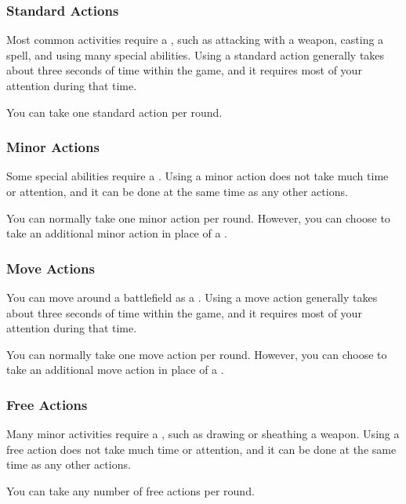         \subsubsection{Standard Actions}\label{Standard Actions}
            Most common activities require a , such as attacking with a weapon, casting a spell, and using many special abilities.
            Using a standard action generally takes about three seconds of time within the game, and it requires most of your attention during that time.

            You can take one standard action per round.

        \subsubsection{Minor Actions}\label{Minor Actions}
            Some special abilities require a .
            Using a minor action does not take much time or attention, and it can be done at the same time as any other actions.

            You can normally take one minor action per round.
            However, you can choose to take an additional minor action in place of a .

        \subsubsection{Move Actions}\label{Move Actions}
            You can move around a battlefield as a .
            Using a move action generally takes about three seconds of time within the game, and it requires most of your attention during that time.

            You can normally take one move action per round.
            However, you can choose to take an additional move action in place of a .

        \subsubsection{Free Actions}\label{Free Actions}
            Many minor activities require a , such as drawing or sheathing a weapon.
            Using a free action does not take much time or attention, and it can be done at the same time as any other actions.

            You can take any number of free actions per round.

